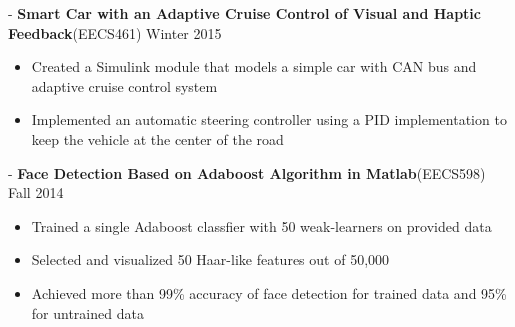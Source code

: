 \documentclass[11pt]{res}
\begin{document}
\begin{resume}
  -\sectionwidth \resumewidth  
\textbf{Smart Car with an Adaptive Cruise Control of Visual and Haptic Feedback}{(EECS461)}   \hfill{Winter 2015}  \hspace{-0.58in}\vspace{-0mm}\\
  \vspace{-14pt}
 \begin{itemize}[leftmargin=-0.1in]
  \item Created a Simulink module that models a simple car with CAN bus and adaptive cruise control system  \vspace{-5pt}
  \item Implemented an automatic steering controller using a PID implementation to keep the vehicle at the center of the road  \vspace{-3pt}
   \end{itemize}\vspace{-10pt}
     

 -\sectionwidth \resumewidth
\textbf{Face Detection Based on Adaboost Algorithm in Matlab}{(EECS598)}   \hfill{Fall 2014}  \hspace{-0.58in}\vspace{-0mm}\\
\vspace{-14pt}
 \begin{itemize}[leftmargin=-0.1in]
  \item Trained a single Adaboost classfier with 50 weak-learners on provided data  \vspace{-5pt}
  \item Selected and visualized 50 Haar-like features out of 50,000\vspace{-5pt}
  \item Achieved more than 99\% accuracy of face detection for trained data and 95\% for untrained data\vspace{-3pt}
  \end{itemize}\vspace{-10pt}


\end{resume}
\end{document}
